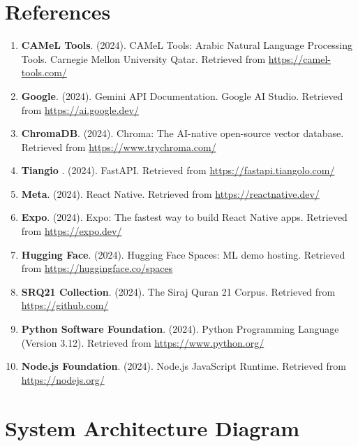 \documentclass[11pt, a4paper]{article}
\begin{document}
\section{References}

\begin{enumerate}
    \item \textbf{CAMeL Tools}. (2024). CAMeL Tools: Arabic Natural Language Processing Tools. Carnegie Mellon University Qatar. Retrieved from \url{https://camel-tools.com/}
    
    \item \textbf{Google}. (2024). Gemini API Documentation. Google AI Studio. Retrieved from \url{https://ai.google.dev/}
    
    \item \textbf{ChromaDB}. (2024). Chroma: The AI-native open-source vector database. Retrieved from \url{https://www.trychroma.com/}
    
    \item \textbf{Tiangio }. (2024). FastAPI. Retrieved from \url{https://fastapi.tiangolo.com/}
    
    \item \textbf{Meta}. (2024). React Native. Retrieved from \url{https://reactnative.dev/}
    
    \item \textbf{Expo}. (2024). Expo: The fastest way to build React Native apps. Retrieved from \url{https://expo.dev/}
    
    \item \textbf{Hugging Face}. (2024). Hugging Face Spaces: ML demo hosting. Retrieved from \url{https://huggingface.co/spaces}
    
    \item \textbf{SRQ21 Collection}. (2024). The Siraj Quran 21 Corpus. Retrieved from \url{https://github.com/}
    
    \item \textbf{Python Software Foundation}. (2024). Python Programming Language (Version 3.12). Retrieved from \url{https://www.python.org/}
    
    \item \textbf{Node.js Foundation}. (2024). Node.js JavaScript Runtime. Retrieved from \url{https://nodejs.org/}
\end{enumerate}

\appendix
\section{System Architecture Diagram}
\end{document}
